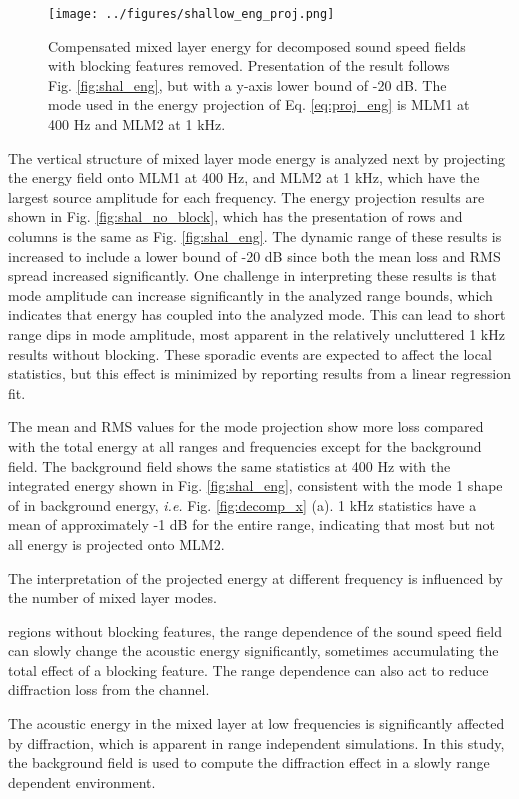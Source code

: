 \documentclass[preprint,NumberedRefs]{JASA}
\begin{document}
\begin{figure}
\texttt{[image: ../figures/shallow\_eng\_proj.png]}
    \caption{Compensated mixed layer energy for decomposed sound speed fields with blocking features removed. Presentation of the result follows Fig. \ref{fig:shal_eng}, but with a y-axis lower bound of -20 dB. The mode used in the energy projection of Eq. \eqref{eq:proj_eng} is MLM1 at 400 Hz and MLM2 at 1 kHz.}
    \label{fig:shal_proj}
\end{figure}
The vertical structure of mixed layer mode energy is analyzed next by projecting the energy field onto MLM1 at 400 Hz, and MLM2 at 1 kHz, which have the largest source amplitude for each frequency. The energy projection results are shown in Fig. \ref{fig:shal_no_block}, which has the presentation of rows and columns is the same as Fig. \ref{fig:shal_eng}. The dynamic range of these results is increased to include a lower bound of -20 dB since both the mean loss and RMS spread increased significantly. One challenge in interpreting these results is that mode amplitude can increase significantly in the analyzed range bounds, which indicates that energy has coupled into the analyzed mode. This can lead to short range dips in mode amplitude, most apparent in the relatively uncluttered 1 kHz results without blocking. These sporadic events are expected to affect the local statistics, but this effect is minimized by reporting results from a linear regression fit.

The mean and RMS values for the mode projection show more loss compared with the total energy at all ranges and frequencies except for the background field. The background field shows the same statistics at 400 Hz with the integrated energy shown in Fig. \ref{fig:shal_eng}, consistent with the mode 1 shape of in background energy, \emph{i.e.} Fig. \ref{fig:decomp_x} (a). 1 kHz statistics have a mean of approximately -1 dB for the entire range, indicating that most but not all energy is projected onto MLM2.

The interpretation of the projected energy at different frequency is influenced by the number of mixed layer modes.


 regions without blocking features, the range dependence of the sound speed field can slowly change the acoustic energy significantly, sometimes accumulating the total effect of a blocking feature. The range dependence can also act to reduce diffraction loss from the channel.

The acoustic energy in the mixed layer at low frequencies is significantly affected by diffraction, which is apparent in range independent simulations. In this study, the background field is used to compute the diffraction effect in a slowly range dependent environment.
\end{document}
